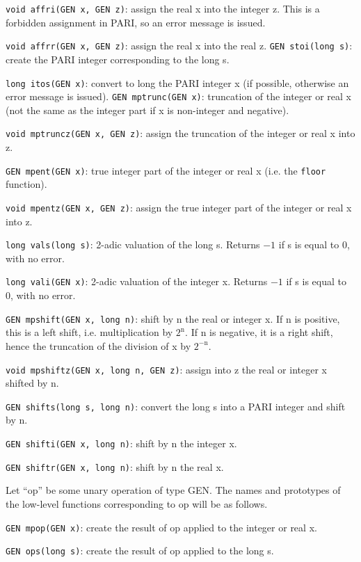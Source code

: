 {\tt void affri(GEN x, GEN z)}: assign the real x into the integer z. This is a
forbidden assignment in PARI, so an error message is issued.

{\tt void affrr(GEN x, GEN z)}: assign the real x into the real z.
\smallskip
{\tt GEN stoi(long s)}: create the PARI integer corresponding to the long s.

{\tt long itos(GEN x)}: convert to long the PARI integer x (if possible,
otherwise an error message is issued).
\smallskip
{\tt GEN mptrunc(GEN x)}: truncation of the integer or real x (not the same
as the integer part if x is non-integer and negative).

{\tt void mptruncz(GEN x, GEN z)}: assign the truncation of the integer or
real x into z. 

{\tt GEN mpent(GEN x)}: true integer part of the integer or real x (i.e. the
{\tt floor} function).

{\tt void mpentz(GEN x, GEN z)}: assign the true integer part of the integer
or real x into z.


{\tt long vals(long s)}: 2-adic valuation of the long s. Returns $-1$ if
s is equal to 0, with no error.

{\tt long vali(GEN x)}: 2-adic valuation of the integer x. Returns $-1$ if
s is equal to 0, with no error.

{\tt GEN mpshift(GEN x, long n)}: shift by n the real or integer x. If n is
positive, this is a left shift, i.e. multiplication by $2^{\text{n}}$. If
n is negative, it is a right shift, hence the truncation of the division of x
by $2^{-\text{n}}$.

{\tt void mpshiftz(GEN x, long n, GEN z)}: assign into z the real or integer x
shifted by n.

{\tt GEN shifts(long s, long n)}: convert the long s into a PARI integer and
shift by n.

{\tt GEN shifti(GEN x, long n)}: shift by n the integer x.

{\tt GEN shiftr(GEN x, long n)}: shift by n the real x.


Let ``op'' be some unary operation of type GEN. The names and prototypes of
the low-level functions corresponding to op will be as follows.

{\tt GEN mpop(GEN x)}: create the result of op applied to the integer or real
x.

{\tt GEN ops(long s)}: create the result of op applied to the long s.

